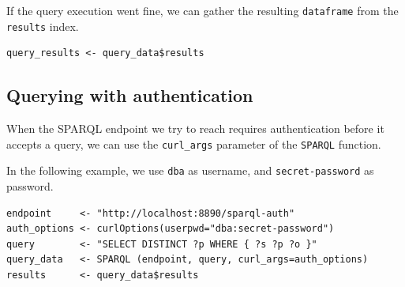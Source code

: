 \documentclass[11pt,a4paper,oneside]{book}
\begin{document}
  If the query execution went fine, we can gather the resulting
  \texttt{dataframe} from the \texttt{results} index.

\begin{siderules}
\begin{verbatim}
query_results <- query_data$results
\end{verbatim}
\end{siderules}

\subsection{Querying with authentication}

  When the SPARQL endpoint we try to reach requires authentication before
  it accepts a query, we can use the \texttt{curl\_args} parameter of the
  \texttt{SPARQL} function.

  In the following example, we use \texttt{dba} as username, and
  \texttt{secret-password} as password.

\begin{siderules}
\begin{verbatim}
endpoint     <- "http://localhost:8890/sparql-auth"
auth_options <- curlOptions(userpwd="dba:secret-password")
query        <- "SELECT DISTINCT ?p WHERE { ?s ?p ?o }"
query_data   <- SPARQL (endpoint, query, curl_args=auth_options)
results      <- query_data$results
\end{verbatim}
\end{siderules}
\end{document}
